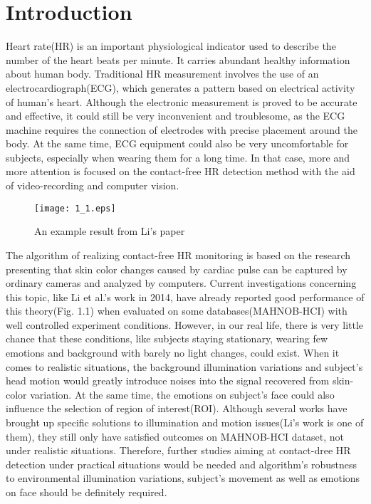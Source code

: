 \chapter{Introduction}
Heart rate(HR) is an important physiological indicator used to describe the number of the heart beats per minute. It carries abundant healthy information about human body. Traditional HR measurement involves the use of an electrocardiograph(ECG), which generates a pattern based on electrical activity of human's heart. Although the electronic measurement is proved to be accurate and effective\cite{mason2007electrocardiographic}, it could still be very inconvenient and troublesome, as the ECG machine requires the connection of electrodes with precise placement around the body. At the same time, ECG equipment could also be very uncomfortable for subjects, especially when wearing them for a long time. In that case, more and more attention is focused on the contact-free HR detection method with the aid of video-recording and computer vision.

\begin{figure}[ht]
\centering
\texttt{[image: 1\_1.eps]}
\caption{An example result from Li's paper}\label{fig:noted-figure}
\end{figure}

The algorithm of realizing contact-free HR monitoring is based on the research presenting that skin color changes caused by cardiac pulse can be captured by ordinary cameras and analyzed by computers\cite{poh2010non,verkruysse2008remote}. Current investigations concerning this topic, like Li et al.'s work in 2014\cite{li2014remote}, have already reported good performance of this theory(Fig. 1.1) when evaluated on some databases(MAHNOB-HCI) with well controlled experiment conditions. However, in our real life, there is very little chance that these conditions, like subjects staying stationary, wearing few emotions and background with barely no light changes, could exist. When it comes to realistic situations, the background illumination variations and subject's head motion would greatly introduce noises into the signal recovered from skin-color variation. At the same time, the emotions on subject’s face could also influence the selection of region of interest(ROI). Although several works have brought up specific solutions to illumination and motion issues(Li's work is one of them), they still only have satisfied outcomes on MAHNOB-HCI dataset, not under realistic situations. Therefore, further studies aiming at contact-dree HR detection under practical situations would be needed and algorithm's robustness to environmental illumination variations, subject's movement as well as emotions on face should be definitely required. 

